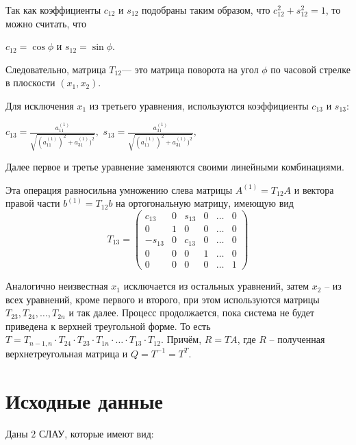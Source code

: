 \documentclass[12pt, a4paper]{article}
\begin{document}
Так как коэффициенты $c_{12}$ и $s_{12}$ подобраны таким образом, что $c_{12}^{2} + s_{12}^{2}=1$, то можно считать, что 
\begin{center}
$c_{12}=\cos{\phi}$ и $s_{12}=\sin{\phi}.$ 
\end{center}	

Следовательно, матрица $T_{12}$--- это матрица поворота на угол $\phi$ по часовой стрелке в плоскости $(x_1,x_2)$. 

\pagebreak

Для исключения $x_1$ из третьего уравнения, используются коэффициенты $c_{13}$ и $s_{13}$:
\begin{center}
    $c_{13}=\frac{a_{11}^{(1)}}{\sqrt{(a_{11}^{(1)})^2+a_{31}^{(1)})^2}},$
    $s_{13}=\frac{a_{31}^{(1)}}{\sqrt{(a_{11}^{(1)})^2+a_{31}^{(1)})^2}},$
\end{center}
    
Далее первое и третье уравнение заменяются своими линейными комбинациями. 

Эта операция равносильна умножению слева матрицы $A^{(1)}=T_{12}A$ и вектора правой части $b^{(1)}=T_{12}b$ на ортогональную матрицу, имеющую вид 
\[
T_{13}=
\begin{pmatrix}
c_{13} & 0 & s_{13} & 0 & \ldots & 0 \\
0 & 1 & 0 & 0 & \ldots & 0 \\
-s_{13} & 0 & c_{13} & 0 & \ldots & 0 \\
0 & 0 & 0 & 1 & \ldots & 0 \\
0 & 0 & 0 & 0 & \ldots & 1
\end{pmatrix}
\]

Аналогично неизвестная $x_{1}$ исключается из остальных уравнений, затем \linebreak $x_{2}$ -- из всех уравнений, кроме первого и второго, при этом используются матрицы $T_{23},T_{24}, \ldots, T_{2n}$ и так далее. Процесс продолжается, пока система не будет приведена к верхней треугольной форме. То есть $ T = T_{n - 1, n} \cdot T_{24} \cdot T_{23} \cdot T_{1n} \cdot \ldots \cdot T_{13} \cdot T_{12}. $ Причём, $R=TA$, где $R$ -- полученная верхнетреугольная матрица и $Q=T^{-1}=T^{T}.$

\newpage

\section{Исходные данные}
Даны $2$ СЛАУ, которые имеют вид: 
\end{document}
